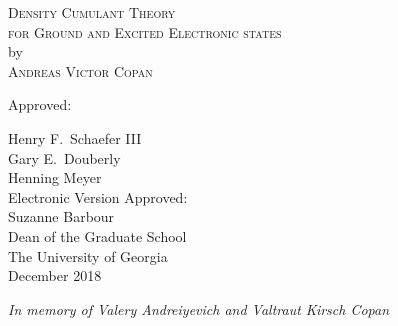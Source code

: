 \documentclass[12pt,notitlepage]{report}
\newcommand{\dissertationtitle}{%
    Density Cumulant Theory\\for Ground and Excited Electronic states}
\newcommand{\whoami}{Andreas Victor Copan}
\begin{document}
\newpage
\thispagestyle{empty}
\vspace*{18pt}
\begin{center}
\textsc{\large{\dissertationtitle}}\\[18pt]
by\\[18pt]
\textsc{\whoami}
\end{center}
\vfill
\begin{flushleft}\singlespacing
\hskip 200pt {Approved:}\\
\vspace{12pt}

\hspace*{200pt}Henry F.~Schaefer III\\
\vspace{12pt}
\hspace*{200pt}Gary E.~Douberly\\
\hspace*{200pt}\makebox[100pt][l]{}Henning Meyer\\
\vfill
Electronic Version Approved:\\[12pt]
Suzanne Barbour\\
Dean of the Graduate School\\
The University of Georgia\\
December 2018
\end{flushleft}

\newpage
\vspace*{1.5in}
\begin{center}
\emph{In memory of Valery Andreiyevich and Valtraut Kirsch Copan}\\
\vspace{6pt}
\end{center}



\tableofcontents
\clearpage
{}







\newpage


\end{document}

